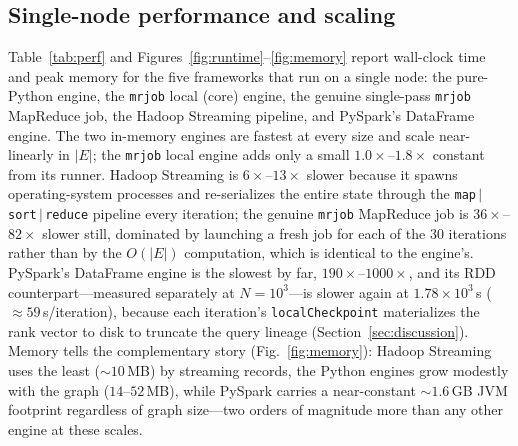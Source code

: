 \subsection{Single-node performance and scaling}
Table~\ref{tab:perf} and Figures~\ref{fig:runtime}--\ref{fig:memory} report
wall-clock time and peak memory for the five frameworks that run on a single node:
the pure-Python engine, the \texttt{mrjob} local (core) engine, the genuine
single-pass \texttt{mrjob} MapReduce job, the Hadoop Streaming pipeline, and
PySpark's DataFrame engine. The two in-memory engines are fastest at every size
and scale near-linearly in $|E|$; the \texttt{mrjob} local engine adds only a
small $1.0\times$--$1.8\times$ constant from its runner. Hadoop Streaming is
$6\times$--$13\times$ slower because it spawns operating-system processes and
re-serializes the entire state through the \texttt{map$\,|\,$sort$\,|\,$reduce}
pipeline every iteration; the genuine \texttt{mrjob} MapReduce job is
$36\times$--$82\times$ slower still, dominated by launching a fresh job for each
of the 30 iterations rather than by the $O(|E|)$ computation, which is identical
to the engine's. PySpark's DataFrame engine is the slowest by far,
$190\times$--$1000\times$, and its RDD counterpart---measured separately at
$N=10^3$---is slower again at $1.78\times10^3$\,s ($\approx\!59$\,s/iteration),
because each iteration's \texttt{localCheckpoint} materializes the rank vector to
disk to truncate the query lineage (Section~\ref{sec:discussion}). Memory tells
the complementary story (Fig.~\ref{fig:memory}): Hadoop Streaming uses the least
($\sim\!10$\,MB) by streaming records, the Python engines grow modestly with the
graph ($14$--$52$\,MB), while PySpark carries a near-constant $\sim\!1.6$\,GB JVM
footprint regardless of graph size---two orders of magnitude more than any other
engine at these scales.


